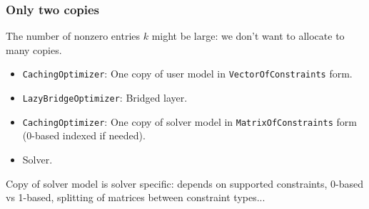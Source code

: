 \documentclass{beamer}
\begin{document}
  \begin{frame}[fragile]
    \frametitle{Only two copies}
    The number of nonzero entries $k$ might be \alert{large}: we don't want to allocate to many \alert{copies}.
    \begin{itemize}
      \item \texttt{CachingOptimizer}: One copy of \alert{user} model in \texttt{VectorOfConstraints} form.
      \item \texttt{LazyBridgeOptimizer}: Bridged layer.
      \item \texttt{CachingOptimizer}: One copy of \alert{solver} model in \texttt{MatrixOfConstraints} form (0-based indexed if needed).
      \item Solver.
    \end{itemize}
    Copy of solver model is solver \alert{specific}: depends on supported constraints, 0-based vs 1-based, splitting of matrices between constraint types...
  \end{frame}
\end{document}
